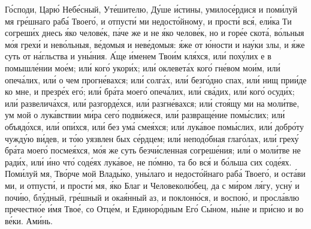 \begin{mymulticols}
Г\'{о}споди, Цар\'{ю} Неб\'{е}сный, Ут\'{е}шителю, Д\'{у}ше \'{и}стины, умилос\'{е}рдися и пом\'{и}луй мя гр\'{е}шнаго раб\'{а} Твоег\'{о}, и отпуст\'{и} ми недост\'{о}йному, и прост\'{и} вс\'{я}, ел\'{и}ка Ти согреш\'{и}х днесь \'{я}ко челов\'{е}к, п\'{а}че же и не \'{я}ко челов\'{е}к, но и гор\'{е}е скот\'{а}, в\'{о}льныя м\'{о}я грех\'{и} и нев\'{о}льныя, в\'{е}домыя и нев\'{е}домыя: \'{я}же от \'{ю}ности и на\'{у}ки злы, и \'{я}же суть от н\'{а}гльства и ун\'{ы}ния. \'{А}ще \'{и}менем Тво\'{и}м кл\'{я}хся, ил\'{и} пох\'{у}лих е в помышл\'{е}нии мо\'{е}м; ил\'{и} ког\'{о} укор\'{и}х; ил\'{и} оклевет\'{а}х ког\'{о} гн\'{е}вом мо\'{и}м, ил\'{и} опеч\'{а}лих, ил\'{и} о чем прогн\'{е}вахся; ил\'{и} солг\'{а}х, ил\'{и} безг\'{о}дно спах, ил\'{и} нищ при\'{и}де ко мне, и презр\'{е}х ег\'{о}; ил\'{и} бр\'{а}та моег\'{о} опеч\'{а}лих, ил\'{и} св\'{а}дих, ил\'{и} ког\'{о} осуд\'{и}х; ил\'{и} развелич\'{а}хся, ил\'{и} разгорд\'{е}хся, ил\'{и} разгн\'{е}вахся; ил\'{и} сто\'{я}щу ми на мол\'{и}тве, ум мой о лук\'{а}вствии м\'{и}ра сег\'{о} подв\'{и}жеся, ил\'{и} развращ\'{е}ние пом\'{ы}слих; ил\'{и} объяд\'{о}хся, ил\'{и} оп\'{и}хся, ил\'{и} без ум\'{а} сме\'{я}хся; ил\'{и} лук\'{а}вое пом\'{ы}слих, ил\'{и} добр\'{о}ту чужд\'{у}ю в\'{и}дев, и т\'{о}ю уязвлен бых с\'{е}рдцем; ил\'{и} непод\'{о}бная глаг\'{о}лах, ил\'{и} грех\'{у} бр\'{а}та моег\'{о} посме\'{я}хся, м\'{о}я же суть безч\'{и}сленная согреш\'{е}ния; ил\'{и} о мол\'{и}тве не рад\'{и}х, ил\'{и} \'{и}но чт\'{о} сод\'{е}ях лук\'{а}вое, не п\'{о}мню, та бо вс\'{я} и б\'{о}льша сих сод\'{е}ях. Пом\'{и}луй мя, Тв\'{о}рче мой Влад\'{ы}ко, ун\'{ы}лаго и недост\'{о}йнаго раб\'{а} Твоег\'{о}, и ост\'{а}ви ми, и отпуст\'{и}, и прост\'{и} мя, \'{я}ко Благ и Человекол\'{ю}бец, да с м\'{и}ром л\'{я}гу, усн\'{у} и поч\'{и}ю, бл\'{у}дный, гр\'{е}шный и ока\'{я}нный аз, и поклон\'{ю}ся, и воспо\'{ю}, и просл\'{а}влю пречестн\'{о}е \'{и}мя Тво\'{е}, со Отц\'{е}м, и Единор\'{о}дным Ег\'{о} С\'{ы}ном, н\'{ы}не и пр\'{и}сно и во в\'{е}ки. Ам\'{и}нь.



\end{mymulticols}
